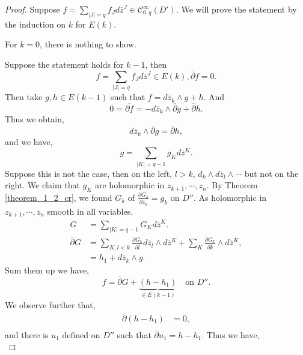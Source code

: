 \documentclass{article}
\newcommand{\pd}[2]{{\frac {\partial#1} {\partial#2}}}
\begin{document}
\begin{proof}
  Suppose $f = \sum_{\vert J\vert = q}f_Jd\overline{z}^J\in\mathcal{C}^\infty_{0,q}(D')$.  We will prove the statement by the induction on $k$ for $E(k)$.
  \par For $k=0$, there is nothing to show.
  \par Suppose the statement holds for $k-1$, then 
  \begin{equation*}
    f = \sum_{\vert J\vert = q}f_Jd\overline{z}^J\in E(k),\overline{\partial}f = 0.
  \end{equation*} 
  Then take $g,h\in E(k-1)$ such that $f = d\overline{z}_k\wedge g +h$. And 
  \begin{equation*}
    0 = \overline{\partial f} = -d\overline{z}_k\wedge\overline{\partial}g+\overline{\partial}h.
  \end{equation*}
  Thus we obtain,
  \begin{equation*}
    d\overline{z}_k\wedge\overline{\partial}g=\overline{\partial}h,
  \end{equation*}
  and we have,
  \begin{equation*}
    g = \sum_{\vert K\vert = q-1}g_Kd\overline{z}^K.
  \end{equation*}
  Suppose this is not the case, then on the left, $l>k$, $d_k\wedge d\overline{z}_l\wedge\cdots$ but not on the right. 
  We claim that $g_K$ are holomorphic in $z_{k+1},\cdots,z_n$. By Theorem \ref{theorem_1_2_cr}, we found $G_k$ of $\pd{G_k}{\overline{z}_k} = g_k$ on $D''$.
  As holomorphic in $z_{k+1},\cdots,z_n$ smooth in all variables.
  \begin{align*}
  G &= \sum_{\vert K\vert = q-1}G_Kd\overline{z}^K.\\
  \overline{\partial}G & = \sum_{K,l< k}\pd{G_k}{\overline{l}}d\overline{z}_l\wedge d\overline{z}^K + \sum_{K}\pd{G_k}{\overline{k}}\wedge d\overline{z}^K,\\
  & = h_1+d\overline{z}_k\wedge g.
  \end{align*}
  Sum them up we have,
  \begin{equation*}
    f = \overline{\partial}G+\underbrace{(h-h_1)}_{\in E(k-1)}\quad\text{on $D''$}.
  \end{equation*}
  We observe further that,
  \begin{align}
    \overline{\partial}(h-h_1) &= 0,\\
  \end{align}
  and there is $u_1$ defined on $D''$ such that $\overline{\partial}u_1 = h-h_1$. Thus we have,
  \begin{equation*}

\end{equation*}
\end{proof}
\end{document}
